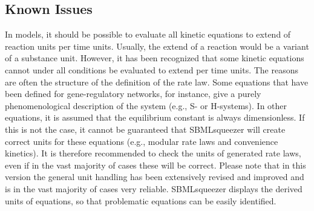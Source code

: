\subsection{Known Issues}

In \SBML models, it should be possible to evaluate all kinetic equations to
extend of reaction units per time units. Usually, the extend of a reaction would
be a variant of a substance unit. However, it has been recognized that some
kinetic equations cannot under all conditions be evaluated to extend per time
units. The reasons are often the structure of the definition of the rate law.
Some equations that have been defined for gene-regulatory networks, for
instance, give a purely phenomenological description of the system (e.g.,
S- or H-systems). In other equations, it is assumed that the equilibrium constant
is always dimensionless. If this is not the case, it cannot be guaranteed that
SBMLsqueezer will create correct units for these equations (e.g., modular rate
laws and convenience kinetics). It is therefore recommended to check the units
of generated rate laws, even if in the vast majority of cases these will be
correct. Please note that in this version the general unit handling has been
extensively revised and improved and is in the vast majority of cases very
reliable. SBMLsqueezer displays the derived units of equations, so that
problematic equations can be easily identified.

